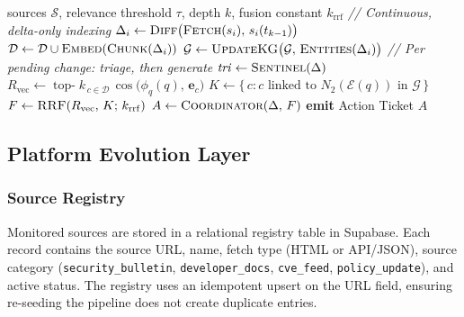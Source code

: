 \documentclass[
]{article}
\begin{document}
\begin{algorithm}[t]
\caption{ECI: from ecosystem change to Action Ticket}
\label{alg:eci}
\begin{algorithmic}[1]
\Require sources $\mathcal{S}$, relevance threshold $\tau$, depth $k$, fusion constant $k_{\mathrm{rrf}}$
\Statex \textit{// Continuous, delta-only indexing}
  \State $\Delta_i \gets \textsc{Diff}\big(\textsc{Fetch}(s_i),\, s_i(t_{k-1})\big)$
    \State $\mathcal{D} \gets \mathcal{D} \cup \textsc{Embed}(\textsc{Chunk}(\Delta_i))$ 
    \State $\mathcal{G} \gets \textsc{UpdateKG}\big(\mathcal{G},\, \textsc{Entities}(\Delta_i)\big)$
  \EndIf
\EndFor
\Statex \textit{// Per pending change: triage, then generate}
  \State $\mathit{tri} \gets \textsc{Sentinel}(\Delta)$ 
    \State $R_{\mathrm{vec}} \gets \operatorname{top\text{-}}k_{\,c \in \mathcal{D}}\, \cos\!\big(\phi_q(q),\, \mathbf{e}_c\big)$
    \State $K \gets \{\,c : c \text{ linked to } N_2(\mathcal{E}(q)) \text{ in } \mathcal{G}\,\}$
    \State $F \gets \textsc{RRF}(R_{\mathrm{vec}},\, K;\, k_{\mathrm{rrf}})$ 
    \State $A \gets \textsc{Coordinator}(\Delta,\, F)$ 
    \State \textbf{emit} Action Ticket $A$
  \EndIf
\EndFor
\end{algorithmic}
\end{algorithm}

\subsection{Platform Evolution Layer}\label{platform-evolution-layer}

\subsubsection{Source Registry}

Monitored sources are stored in a relational registry table in Supabase. Each record contains the source URL, name, fetch type (HTML or API/JSON), source category (\texttt{security\_bulletin}, \texttt{developer\_docs}, \texttt{cve\_feed}, \texttt{policy\_update}), and active status. The registry uses an idempotent upsert on the URL field, ensuring re-seeding the pipeline does not create duplicate entries.
\end{document}
